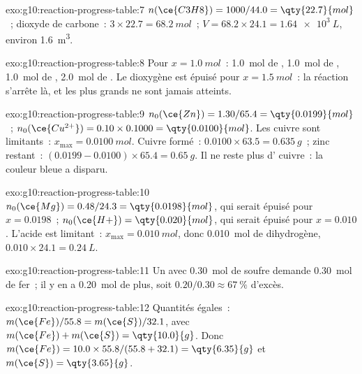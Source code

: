 \begin{solution}{exo:g10:reaction-progress-table:7}
$n(\ce{C3H8}) = 1000 / 44.0 = \qty{22.7}{mol}$~; dioxyde de carbone~:
$3 \times 22.7 = \qty{68.2}{mol}$~; $V = 68.2 \times 24.1 =
\qty{1.64e3}{L}$, environ \qty{1.6}{m^3}.
\end{solution}

\begin{solution}{exo:g10:reaction-progress-table:8}
Pour $x = \qty{1.0}{mol}$~: \qty{1.0}{mol} de , \qty{1.0}{mol}
de , \qty{1.0}{mol} de , \qty{2.0}{mol} de . Le
dioxygène est épuisé pour $x = \qty{1.5}{mol}$~: la réaction s'arrête
là, et les  plus grands ne sont jamais atteints.
\end{solution}

\begin{solution}{exo:g10:reaction-progress-table:9}
$n_0(\ce{Zn}) = 1.30 / 65.4 = \qty{0.0199}{mol}$~;
$n_0(\ce{Cu^{2+}}) = 0.10 \times 0.1000 = \qty{0.0100}{mol}$. Les 
cuivre sont limitants~: $x_{\max} = \qty{0.0100}{mol}$. Cuivre formé~:
$0.0100 \times 63.5 = \qty{0.635}{g}$~; zinc restant~:
$(0.0199 - 0.0100) \times 65.4 = \qty{0.65}{g}$. Il ne reste plus d'
cuivre~: la couleur bleue a disparu.
\end{solution}

\begin{solution}{exo:g10:reaction-progress-table:10}
$n_0(\ce{Mg}) = 0.48 / 24.3 = \qty{0.0198}{mol}$, qui serait épuisé pour
$x = 0.0198$~; $n_0(\ce{H+}) = \qty{0.020}{mol}$, qui serait épuisé pour
$x = 0.010$. L'acide est limitant~: $x_{\max} = \qty{0.010}{mol}$, donc
\qty{0.010}{mol} de dihydrogène, $0.010 \times 24.1 = \qty{0.24}{L}$.
\end{solution}

\begin{solution}{exo:g10:reaction-progress-table:11}
Un  avec \qty{0.30}{mol} de soufre demande
\qty{0.30}{mol} de fer~; il y en a \qty{0.20}{mol} de plus, soit
$0.20 / 0.30 \approx \qty{67}{\percent}$ d'excès.
\end{solution}

\begin{solution}{exo:g10:reaction-progress-table:12}
Quantités égales~: $m(\ce{Fe})/55.8 = m(\ce{S})/32.1$, avec
$m(\ce{Fe}) + m(\ce{S}) = \qty{10.0}{g}$. Donc
$m(\ce{Fe}) = 10.0 \times 55.8 / (55.8 + 32.1) = \qty{6.35}{g}$ et
$m(\ce{S}) = \qty{3.65}{g}$.
\end{solution}

